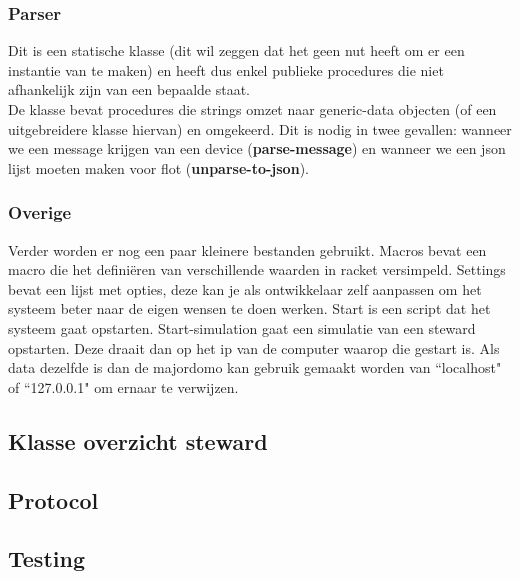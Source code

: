 \documentclass{article}
\begin{document}
\subsubsection{Parser}
\label{ssub:parser}
Dit is een statische klasse (dit wil zeggen dat het geen nut heeft om er een instantie van te maken) en heeft dus enkel publieke procedures die niet afhankelijk zijn van een bepaalde staat.\\
De klasse bevat procedures die strings omzet naar generic-data objecten (of een uitgebreidere klasse hiervan) en omgekeerd. Dit is nodig in twee gevallen: wanneer we een message krijgen van een device (\textbf{parse-message}) en wanneer we een json lijst moeten maken voor flot (\textbf{unparse-to-json}).\\

\subsubsection{Overige}
\label{ssub:rest}
Verder worden er nog een paar kleinere bestanden gebruikt. Macros bevat een macro die het defini\"eren van verschillende waarden in racket versimpeld. Settings bevat een lijst met opties, deze kan je als ontwikkelaar zelf aanpassen om het systeem beter naar de eigen wensen te doen werken. Start is een script dat het systeem gaat opstarten. Start-simulation gaat een simulatie van een steward opstarten. Deze draait dan op het ip van de computer waarop die gestart is. Als data dezelfde is dan de majordomo kan gebruik gemaakt worden van ``localhost" of ``127.0.0.1" om ernaar te verwijzen.


\subsection{Klasse overzicht steward}
\label{sub:class-steward}


\subsection{Protocol}
\label{sub:protocol}


\subsection{Testing}
\label{sub:testing}


\end{document}
